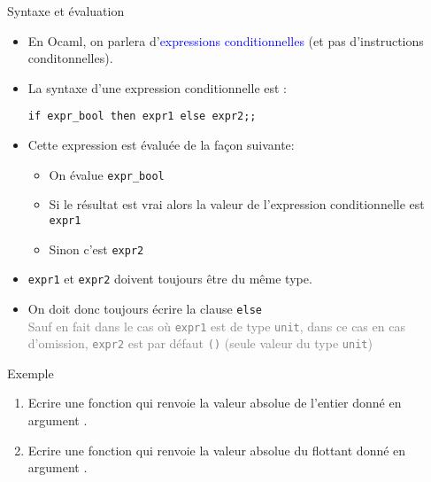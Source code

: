 \documentclass[10pt]{beamer}
\begin{document}
\begin{frame}[fragile]{\Ctitle}{\stitle}
	\begin{block}{Syntaxe et évaluation}
		\begin{itemize}
		\item<1-> En Ocaml, on parlera d'\textcolor{blue}{expressions conditionnelles} (et pas d'instructions conditonnelles).
		\item<2-> La syntaxe d'une expression conditionnelle est :
		\begin{verbatim}
if expr_bool then expr1 else expr2;;
		\end{verbatim}
		\item<3-> Cette expression est évaluée de la façon suivante:
		\begin{itemize}
			\item<4-> On évalue {\tt expr\_bool}
			\item<5-> Si le résultat est vrai alors la valeur de l'expression conditionnelle est {\tt expr1}
			\item<6-> Sinon c'est {\tt expr2}
		\end{itemize}
		\item<7-> {\tt expr1} et {\tt expr2} doivent toujours être du même type.
		\item<8-> On doit donc toujours écrire la clause {\tt else} \\
		\onslide<9->\textcolor{gray}{\small Sauf en fait dans le cas où {\tt expr1} est de type {\tt unit}, dans ce cas en cas d'omission, {\tt expr2} est par défaut {\tt ()} (seule valeur du type {\tt unit})}
	\end{itemize}
	\end{block}
\end{frame}

\begin{frame}{\Ctitle}{\stitle}
	\begin{exampleblock}{Exemple}
		\begin{enumerate}
			\item<1-> Ecrire une fonction  qui renvoie la valeur absolue de l'entier donné en argument .
				\onslide<2->
			\item<3-> Ecrire une fonction  qui renvoie la valeur absolue du flottant donné en argument .
				\onslide<4->
		\end{enumerate}
	\end{exampleblock}
\end{frame}
\end{document}
